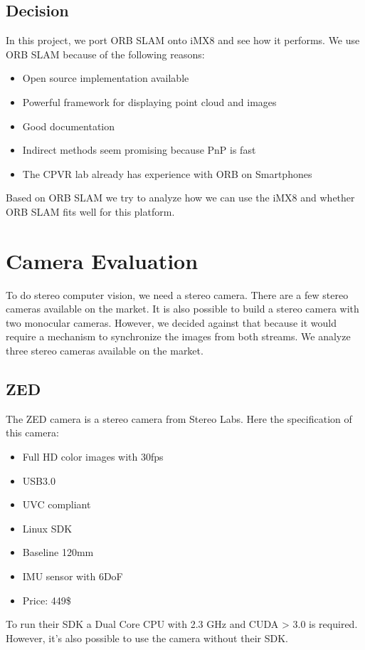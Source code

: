 \documentclass[11pt,a4paper,titlepage,oneside]{report}
\begin{document}
\section{Decision}

In this project, we port ORB SLAM onto iMX8 and see how it performs. We use ORB SLAM because of the following reasons:
\begin{itemize}
	\item Open source implementation available
	\item Powerful framework for displaying point cloud and images
	\item Good documentation
	\item Indirect methods seem promising because PnP is fast
	\item The CPVR lab already has experience with ORB on Smartphones
\end{itemize}

Based on ORB SLAM we try to analyze how we can use the iMX8 and whether ORB SLAM fits well for this platform.

\chapter{Camera Evaluation}

To do stereo computer vision, we need a stereo camera. There are a few stereo cameras available on the market. It is also possible to build a stereo camera with two monocular cameras. However, we decided against that because it would require a mechanism to synchronize the images from both streams. We analyze three stereo cameras available on the market.

\section{ZED}
The ZED camera \cite{zed} is a stereo camera from Stereo Labs. Here the specification of this camera:
\begin{itemize}
	\item Full HD color images with 30fps
	\item USB3.0
	\item UVC compliant
	\item Linux SDK
	\item Baseline 120mm
	\item IMU sensor with 6DoF
	\item Price: 449\$
\end{itemize}

To run their SDK a Dual Core CPU with 2.3 GHz and CUDA > 3.0 is required. However, it's also possible to use the camera without their SDK.
\end{document}
